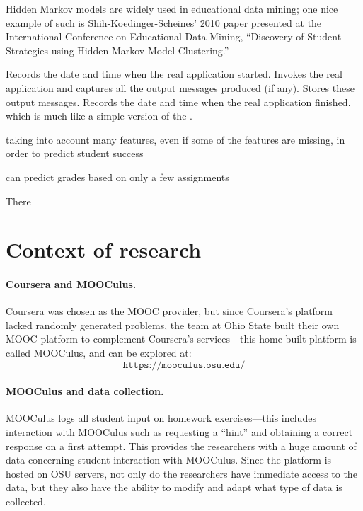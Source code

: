 \documentclass[12pt]{article}
\begin{document}
Hidden Markov models are widely used in educational data mining; one
nice example of such is Shih-Koedinger-Scheines' 2010 paper
presented at the International Conference on Educational Data Mining,
``Discovery of Student Strategies using Hidden Markov Model
Clustering.''  \parencite{shihdiscovery}


Records the date and time when the real application started.
Invokes the real application and captures all the output messages produced (if any).
Stores these output messages.
Records the date and time when the real application finished.
\parencite{RomeroZaldivar20121058} 
which is much like a simple version of the \parencite{tin-can-api}.


taking into account many features, even if some of the features are
missing, in order to predict student
success \parencite{Zafra201115020}

can predict grades based on only a few assignments \parencite{predict-grades}


There 



\section{Context of research}


\paragraph{Coursera and MOOCulus.} 
Coursera was chosen as the MOOC provider, but since Coursera's
platform lacked randomly generated problems, the team at Ohio State
built their own MOOC platform to complement Coursera's services---this
home-built platform is called MOOCulus, and can be explored at:
\[
\texttt{https://mooculus.osu.edu/}
\]


\paragraph{MOOCulus and data collection.} 
MOOCulus logs all student input on homework exercises---this includes
interaction with MOOCulus such as requesting a ``hint'' and obtaining
a correct response on a first attempt.  This provides the researchers
with a huge amount of data concerning student interaction with
MOOCulus.  Since the platform is hosted on OSU servers, not only do
the researchers have immediate access to the data, but they also have
the ability to modify and adapt what type of data is collected.
\end{document}
